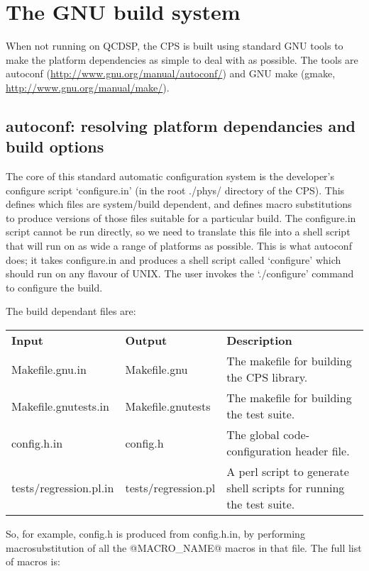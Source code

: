 \documentclass[12pt]{article}
\begin{document}
\section{The GNU build system}
When not running on QCDSP, the CPS is built using standard GNU tools to make
the platform dependencies as simple to deal with as possible.  The tools are
autoconf (\href{http://www.gnu.org/manual/autoconf/}{http://www.gnu.org/manual/autoconf/}) and GNU make (gmake, \href{http://www.gnu.org/manual/make/}{http://www.gnu.org/manual/make/}). 

\subsection{autoconf: resolving platform dependancies and build options}
The core of this standard automatic configuration system is the developer's
configure script `configure.in' (in the root ./phys/ directory of the CPS).  
This defines which files are system/build dependent, and defines macro 
substitutions to produce versions of those files suitable for a particular
build.  The configure.in script cannot be run directly, so we need to
translate this file into a shell script that will run on as wide a range of
platforms as possible.  This is what autoconf does; it takes configure.in and
produces a shell script called `configure' which should run on any flavour of 
UNIX.  The user invokes the `./configure' command to
configure the build.

The build dependant files are:

\begin{tabular}{lll}
{\bf Input} & {\bf Output} & {\bf Description}\\
 Makefile.gnu.in & Makefile.gnu & The makefile for building the CPS library.
 \\
 Makefile.gnutests.in & Makefile.gnutests & The makefile for building the test
 suite. \\
 config.h.in & config.h & The global code-configuration header file. \\
 tests/regression.pl.in & tests/regression.pl & A perl script to generate
 shell scripts for running the test suite. \\
\end{tabular}

So, for example, config.h is produced from config.h.in, by performing
macrosubstitution of all the @MACRO\_NAME@ macros in that file.  The full list
of macros is:
\end{document}
